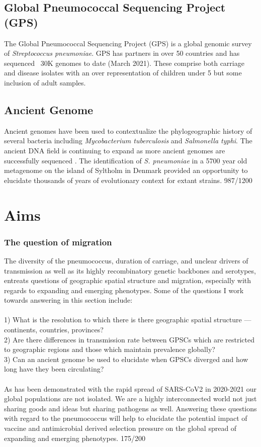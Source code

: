 \documentclass{article}
\begin{document}
\subsection{Global Pneumococcal Sequencing Project (GPS)}
The Global Pneumococcal Sequencing Project (GPS) is a global genomic survey of \textit{Streptococcus pneumoniae}. GPS has partners in over 50 countries and has sequenced ~30K  genomes to date (March 2021). These comprise both carriage and disease isolates with an over representation of children under 5 but some inclusion of adult samples.
\subsection{Ancient Genome }
Ancient genomes have been used to contextualize the phylogeographic history of several bacteria including \textit{Mycobacterium tuberculosis} and \textit{Salmonella typhi}\cite{bosPreColumbianMycobacterialGenomes2014,vageneSalmonellaEntericaGenomes2018}. The ancient DNA field is continuing to expand as more ancient genomes are successfully sequenced \cite{neukamm2000yearoldPathogenGenomes2020}. The identification of \textit{S. pneumoniae} in a 5700 year old metagenome on the island of Syltholm in Denmark provided an opportunity to elucidate thousands of years of evolutionary context for extant strains\cite{jensen5700YearoldHuman2019}. 
987/1200
\section{Aims}
\subsubsection{The question of migration} 
The diversity of the pneumococcus, duration of carriage, and unclear drivers of transmission as well as its highly recombinatory genetic backbones and serotypes, entreats questions of geographic spatial structure and migration, especially with regards to expanding and emerging phenotypes. Some of the questions I work towards answering in this section include:
\\
\\1) What is the resolution to which there is there geographic spatial structure --- continents, countries, provinces? 
\\2) Are there differences in transmission rate between GPSCs which are restricted to geographic regions and those which maintain prevalence globally?  
\\3) Can an ancient genome be used to elucidate when GPSCs diverged and how long have they been circulating? 
\\
\\As has been demonstrated with the rapid spread of SARS-CoV2 in 2020-2021 our global populations are not isolated. We are a highly interconnected world not just sharing goods and ideas but sharing pathogens as well. Answering these questions with regard to the pneumococcus will help to elucidate the potential impact of vaccine and antimicrobial derived selection pressure on the global spread of expanding and emerging phenotypes. 
175/200
\end{document}

